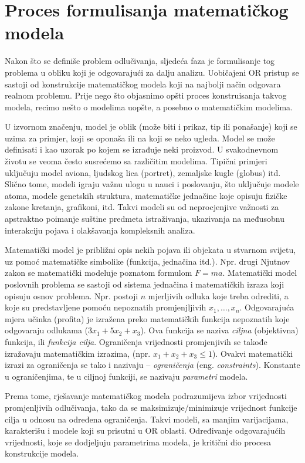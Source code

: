 \documentclass[a4paper, utf8, 11pt, colorlinks]{book}
\theoremstyle{definition}
\begin{document}
\section{Proces formulisanja matematičkog modela}

Nakon što se definiše problem odlučivanja, sljedeća faza je formulisanje tog problema u obliku koji je odgovarajući za dalju analizu. Uobičajeni OR pristup se sastoji od konstrukcije matematičkog modela koji na najbolji način odgovara realnom problemu. Prije nego što objasnimo opšti proces konstruisanja takvog modela, recimo nešto o modelima uopšte, a posebno o matematičkim modelima.

 U izvornom značenju, 
model je oblik (može biti i prikaz, tip ili ponašanje) koji se uzima za primjer, koji se oponaša ili na koji se neko ugleda.  Model se može definisati i kao uzorak po kojem se izrađuje neki proizvod. U svakodnevnom životu se veoma često susrećemo sa različitim modelima.  Tipični primjeri uključuju model aviona, ljudskog lica (portret), zemaljske kugle (globus) itd. Slično tome, modeli igraju
važnu ulogu u nauci i poslovanju, što uključuje modele atoma, modele 
genetskih struktura, matematičke jednačine koje opisuju fizičke zakone kretanja, grafikoni, itd. Takvi modeli
su od neprocjenjive važnosti za apstraktno poimanje suštine predmeta istraživanja, ukazivanja na međusobnu interakciju pojava i olakšavanja kompleksnih analiza. 

Matematički model je približni opis nekih pojava ili objekata u stvarnom svijetu, uz pomoć matematičke simbolike (funkcija, jednačina itd.). Npr. drugi Njutnov zakon se matematički modeluje poznatom formulom $F=ma$. Matematički model poslovnih problema   
se sastoji od sistema jednačina i matematičkih izraza koji opisuju osnov problema. Npr. postoji $n$ mjerljivih odluka koje treba odrediti, a koje su predstavljene pomoću nepoznatih promjenjljivih $x_1,\ldots, x_n$.  Odgovarajuća mjera učinka (profita) je izražena preko matematičkih funkcija nepoznatih koje odgovaraju  odlukama ($3x_1 + 5x_2 + x_3$). Ova funkcija se naziva \emph{ciljna} (objektivna) funkcija, ili \emph{funkcija cilja}. Ograničenja  vrijednosti promjenjivih se takođe izražavaju matematičkim izrazima, (npr. $x_1 + x_2 + x_3 \leq 1$).  Ovakvi matematički izrazi za ograničenja se tako i nazivaju -- \emph{ograničenja} (eng. \emph{constraints}). Konstante u ograničenjima, te u ciljnoj funkciji, se nazivaju \emph{parametri} modela.

Prema tome, rješavanje matematičkog modela 
podrazumijeva izbor vrijednosti promjenljivih odlučivanja, tako da se maksimizuje/minimizuje vrijednost funkcije cilja u odnosu na određena ograničenja. Takvi modeli, sa manjim varijacijama, karakterišu i modele koji su prisutni u OR oblasti. 
Određivanje odgovarajućih vrijednosti, koje se dodjeljuju parametrima modela, je kritični dio procesa konstrukcije modela.
\end{document}
